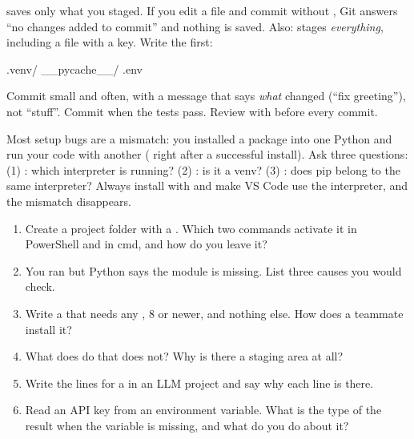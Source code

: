 \begin{trap}
 saves only what you staged. If you edit a file and commit without , Git
answers ``no changes added to commit'' and nothing is saved. Also:  stages \emph{everything},
including a  file with a key. Write the  first:
\begin{rawcode}
.venv/
__pycache__/
.env
\end{rawcode}
\end{trap}

\begin{gamerule}
Commit small and often, with a message that says \emph{what} changed (``fix greeting''), not ``stuff''.
Commit when the tests pass. Review with  before every commit.
\end{gamerule}

\begin{boss}
Most setup bugs are a mismatch: you installed a package into one Python and run your code with another
( right after a successful install). Ask three questions:
(1) : which interpreter is running? (2) : is it a venv?
(3) : does pip belong to the same interpreter? Always install with
 and make VS Code use the  interpreter, and the mismatch disappears.
\end{boss}

\begin{practice}
\begin{enumerate}[leftmargin=*,itemsep=2pt]
\item Create a project folder with a . Which two commands activate it in PowerShell and in cmd, and how do you leave it?
\item You ran  but Python says the module is missing. List three causes you would check.
\item Write a  that needs any ,  8 or newer, and nothing else. How does a teammate install it?
\item What does  do that  does not? Why is there a staging area at all?
\item Write the lines for a  in an LLM project and say why each line is there.
\item Read an API key from an environment variable. What is the type of the result when the variable is missing, and what do you do about it?
\end{enumerate}
\end{practice}

